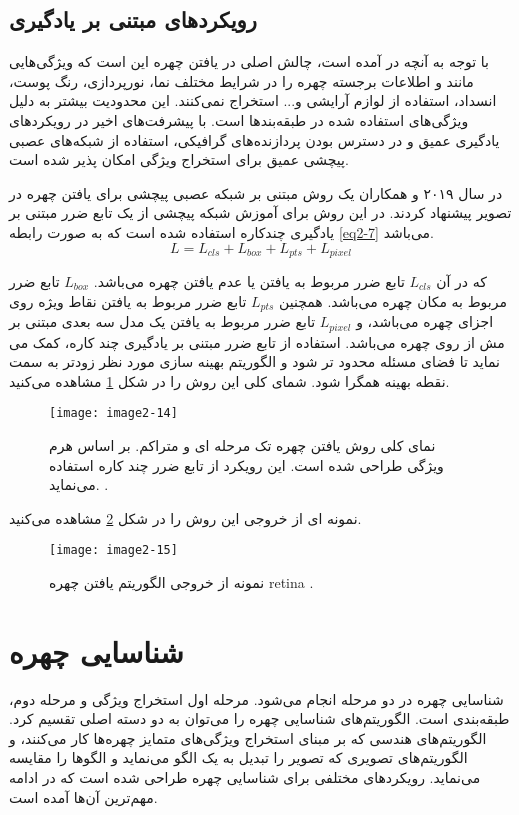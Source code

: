  \subsection{رویکردهای مبتنی بر یادگیری}
با توجه به آنچه در \cite{8253595} آمده است، چالش اصلی در یافتن چهره این است که ویژگی‌هایی مانند  و  اطلاعات برجسته چهره را در شرایط مختلف نما، نورپردازی، رنگ پوست، انسداد، استفاده از لوازم آرایشی و... استخراج نمی‌کنند. این محدودیت بیشتر به دلیل ویژگی‌های استفاده شده در طبقه‌بندها است. با پیشرفت‌های اخیر در رویکردهای یادگیری عمیق و در دسترس بودن پردازنده‌های گرافیکی، استفاده از شبکه‌های عصبی پیچشی عمیق برای استخراج ویژگی امکان پذیر شده است. 

\noindent
در سال ۲۰۱۹  و همکاران \cite{deng2019retinaface} یک روش مبتنی بر شبکه عصبی پیچشی برای یافتن چهره در تصویر پیشنهاد کردند.‌ در این روش برای آموزش شبکه پیچشی از یک تابع ضرر مبتنی بر یادگیری چندکاره  استفاده شده است که به صورت رابطه \ref{eq2-7} می‌باشد.
\begin{equation}\label{eq2-7}
L = L_{cls} + L_{box} + L_{pts} + L_{pixel}  
\end{equation}

\noindent
که در آن $L_{cls}$ تابع ضرر مربوط به یافتن یا عدم یافتن چهره می‌باشد. $L_{box}$ تابع ضرر مربوط به مکان چهره می‌باشد. همچنین $L_{pts}$ تابع ضرر مربوط به یافتن نقاط ویژه روی اجزای چهره می‌باشد، و $L_{pixel}$ تابع ضرر مربوط به یافتن یک مدل سه بعدی مبتنی بر مش از روی چهره می‌باشد. استفاده از تابع ضرر مبتنی بر یادگیری چند کاره، کمک می نماید تا فضای مسئله محدود تر شود و الگوریتم بهینه سازی مورد نظر زودتر به سمت نقطه بهینه همگرا شود. شمای کلی این روش را در شکل \ref{image2-14} مشاهده می‌کنید. 

\begin{figure}[h]
\centering
  \texttt{[image: image2-14]}
  \caption{
نمای کلی روش یافتن چهره تک مرحله ای و متراکم.   بر اساس هرم ویژگی طراحی شده است. این رویکرد از تابع ضرر چند کاره استفاده می‌نماید.
 \cite{deng2019retinaface}.}
  \label{image2-14}
\end{figure}

\noindent
نمونه ای از خروجی این روش را در شکل \ref{image2-15} مشاهده می‌کنید. 
\begin{figure}[h]
	\centering
	\texttt{[image: image2-15]}
	\caption{نمونه از خروجی الگوریتم یافتن چهره retina \cite{deng2019retinaface}.}
	\label{image2-15}
\end{figure}

\section{شناسایی چهره}
شناسایی چهره در دو مرحله انجام می‌شود. مرحله اول استخراج ویژگی و مرحله دوم، طبقه‌بندی است. الگوریتم‌های شناسایی چهره را می‌توان به دو دسته اصلی تقسیم کرد. الگوریتم‌های هندسی که بر مبنای استخراج ویژگی‌های متمایز چهره‌ها کار می‌کنند، و الگوریتم‌های تصویری که تصویر را تبدیل به یک الگو می‌نماید و الگوها را مقایسه می‌نماید. رویکردهای مختلفی برای شناسایی چهره طراحی شده است که در ادامه مهم‌ترین آن‌ها آمده است.

